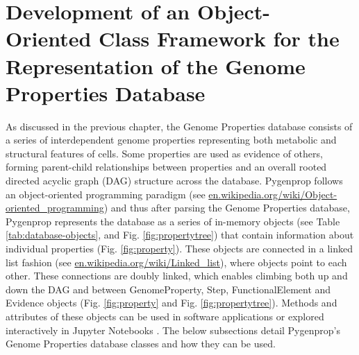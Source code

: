 \section{Development of an Object-Oriented Class Framework for the Representation of the Genome Properties Database} \label{genomeprop-oop}

As discussed in the previous chapter, the Genome Properties database consists of a series of interdependent genome properties representing both metabolic and structural features of cells. Some properties are used as evidence of others, forming parent-child relationships between properties and an overall rooted directed acyclic graph (DAG) structure across the database. Pygenprop follows an object-oriented programming paradigm \cite{booch1986object} (see \href{en.wikipedia.org/wiki/Object-oriented\_programming}{en.wikipedia.org/wiki/Object-oriented\_programming}) and thus after parsing the Genome Properties database, Pygenprop represents the database as a series of in-memory objects (see Table \ref{tab:database-objects}, and Fig. \ref{fig:propertytree}) that contain information about individual properties (Fig. \ref{fig:property}). These objects are connected in a linked list fashion \cite{newell1957programming} (see \href{en.wikipedia.org/wiki/Linked\_list}{en.wikipedia.org/wiki/Linked\_list}), where objects point to each other. These connections are doubly linked, which enables climbing both up and down the DAG and between GenomeProperty, Step, FunctionalElement and Evidence objects (Fig. \ref{fig:property} and Fig. \ref{fig:propertytree}). Methods and attributes of these objects can be used in software applications or explored interactively in Jupyter Notebooks \cite{kluyver2016jupyter}. The below subsections detail Pygenprop's Genome Properties database classes and how they can be used. 

